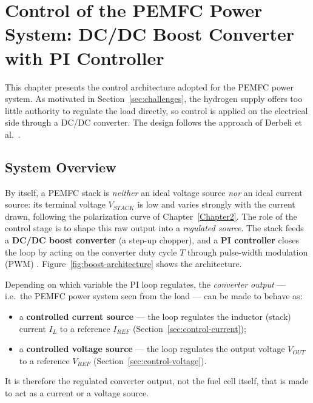 
\chapter{Control of the PEMFC Power System: DC/DC Boost Converter with PI Controller}

\label{Chapter5}

This chapter presents the control architecture adopted for the PEMFC power
system. As motivated in Section~\ref{sec:challenges}, the hydrogen supply offers
too little authority to regulate the load directly, so control is applied on the
electrical side through a DC/DC converter. The design follows the approach of
Derbeli et al.\ \cite{derbeli2017}.

\section{System Overview}
\label{sec:control-overview}

By itself, a PEMFC stack is \emph{neither} an ideal voltage source \emph{nor} an
ideal current source: its terminal voltage $V_{STACK}$ is low and varies strongly
with the current drawn, following the polarization curve of
Chapter~\ref{Chapter2}. The role of the control stage is to shape this raw output
into a \emph{regulated source}. The stack feeds a \textbf{DC/DC boost converter}
(a step-up chopper), and a \textbf{PI controller} closes the loop by acting on the
converter duty cycle $T$ through pulse-width modulation (PWM)
\cite{derbeli2017}. Figure~\ref{fig:boost-architecture} shows the architecture.

Depending on which variable the PI loop regulates, the \emph{converter output}
--- i.e.\ the PEMFC power system seen from the load --- can be made to behave as:
\begin{itemize}
    \item a \textbf{controlled current source} --- the loop regulates the
          inductor (stack) current $I_L$ to a reference $I_{REF}$
          (Section~\ref{sec:control-current});
    \item a \textbf{controlled voltage source} --- the loop regulates the output
          voltage $V_{OUT}$ to a reference $V_{REF}$
          (Section~\ref{sec:control-voltage}).
\end{itemize}
It is therefore the regulated converter output, not the fuel cell itself, that is
made to act as a current or a voltage source.

